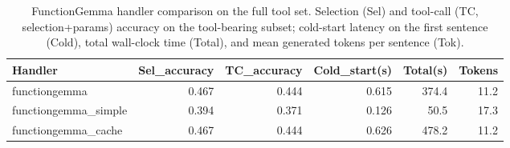 \begin{table}[H]
\centering
\caption{FunctionGemma handler comparison on the full tool set. Selection (Sel) and tool-call (TC, selection+params) accuracy on the tool-bearing subset; cold-start latency on the first sentence (Cold), total wall-clock time (Total), and mean generated tokens per sentence (Tok).}
\label{tab:fg_compare}
\begin{tabular}{lrrrrr}
\toprule
Handler & Sel_accuracy & TC_accuracy & Cold_start(s) & Total(s) & Tokens \\
\midrule
functiongemma & 0.467 & 0.444 & 0.615 & 374.4 & 11.2 \\
functiongemma\_simple & 0.394 & 0.371 & 0.126 & 50.5 & 17.3 \\
functiongemma\_cache & 0.467 & 0.444 & 0.626 & 478.2 & 11.2 \\
\bottomrule
\end{tabular}
\end{table}
